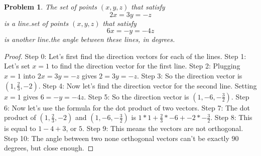 \documentclass{article}
\newtheorem{theorem}{Problem}
\begin{document}
\begin{theorem}
The set of points $(x,y,z)$ that satisfy \n\[2x = 3y = -z\] is a line.\nThe set of points $(x,y,z)$ that satisfy \n\[6x = -y = -4z\] is another line.\nFind the angle between these lines, in degrees.
\end{theorem}

\begin{proof}
Step 0: Let's first find the direction vectors for each of the lines.
Step 1: Let's set $x=1$ to find the direction vector for the first line.
Step 2: Plugging $x=1$ into $2x=3y=-z$ gives $2=3y=-z$.
Step 3: So the direction vector is $(1,\frac{2}{3},-2)$.
Step 4: Now let's find the direction vector for the second line. Setting $x=1$ gives $6= -y = -4z$.
Step 5: So the direction vector is $(1, -6, -\frac{3}{2})$.
Step 6: Now let's use the formula for the dot product of two vectors.
Step 7: The dot product of $(1,\frac{2}{3},-2)$ and $(1, -6, -\frac{3}{2})$ is $1*1 + \frac{2}{3}*-6 + -2*-\frac{3}{2}$.
Step 8: This is equal to $1 - 4 + 3$, or $5$.
Step 9: This means the vectors are not orthogonal.
Step 10: The angle between two none orthogonal vectors can't be exactly $90$ degrees, but close enough.
\end{proof}
\end{document}
